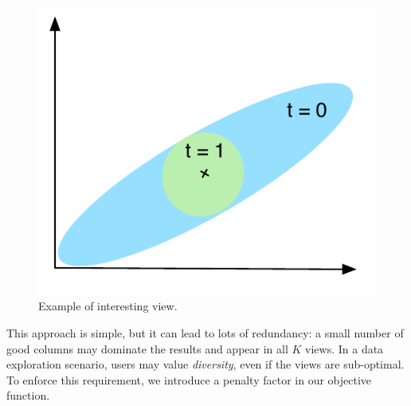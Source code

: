 \begin{figure}
  \centering
  \includegraphics[width=0.8\columnwidth]{Figures/SameMean}
  \caption{Example of interesting view.}
  \label{pic:sameMean}
\end{figure}
This approach is simple, but it can lead to lots of redundancy: a small number
of good columns may dominate the results and appear in all $K$ views. In a data
exploration scenario, users may value \emph{diversity}, even if the views are
sub-optimal. To enforce this requirement, we introduce a penalty factor in our
objective function.

